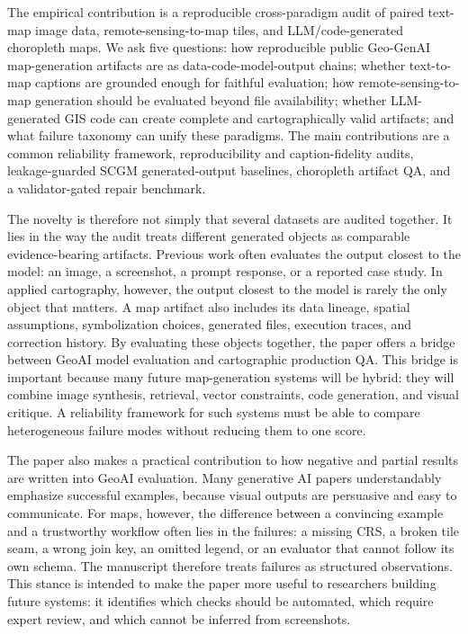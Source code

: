 \documentclass[]{interact}
\begin{document}
The empirical contribution is a reproducible cross-paradigm audit of paired text-map image data, remote-sensing-to-map tiles, and LLM/code-generated choropleth maps. We ask five questions: how reproducible public Geo-GenAI map-generation artifacts are as data-code-model-output chains; whether text-to-map captions are grounded enough for faithful evaluation; how remote-sensing-to-map generation should be evaluated beyond file availability; whether LLM-generated GIS code can create complete and cartographically valid artifacts; and what failure taxonomy can unify these paradigms. The main contributions are a common reliability framework, reproducibility and caption-fidelity audits, leakage-guarded SCGM generated-output baselines, choropleth artifact QA, and a validator-gated repair benchmark.

The novelty is therefore not simply that several datasets are audited together. It lies in the way the audit treats different generated objects as comparable evidence-bearing artifacts. Previous work often evaluates the output closest to the model: an image, a screenshot, a prompt response, or a reported case study. In applied cartography, however, the output closest to the model is rarely the only object that matters. A map artifact also includes its data lineage, spatial assumptions, symbolization choices, generated files, execution traces, and correction history. By evaluating these objects together, the paper offers a bridge between GeoAI model evaluation and cartographic production QA. This bridge is important because many future map-generation systems will be hybrid: they will combine image synthesis, retrieval, vector constraints, code generation, and visual critique. A reliability framework for such systems must be able to compare heterogeneous failure modes without reducing them to one score.

The paper also makes a practical contribution to how negative and partial results are written into GeoAI evaluation. Many generative AI papers understandably emphasize successful examples, because visual outputs are persuasive and easy to communicate. For maps, however, the difference between a convincing example and a trustworthy workflow often lies in the failures: a missing CRS, a broken tile seam, a wrong join key, an omitted legend, or an evaluator that cannot follow its own schema. The manuscript therefore treats failures as structured observations. This stance is intended to make the paper more useful to researchers building future systems: it identifies which checks should be automated, which require expert review, and which cannot be inferred from screenshots.
\end{document}
